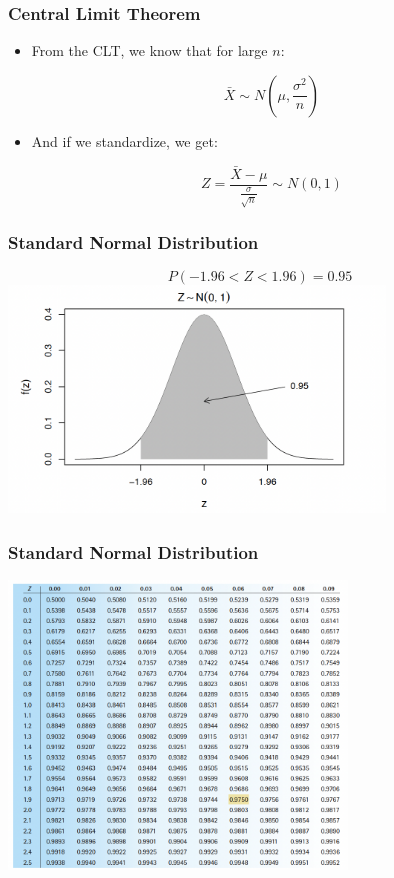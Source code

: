 \documentclass[12pt]{beamer}
\begin{document}
\begin{frame}
	\frametitle{Central Limit Theorem}
	
	\begin{itemize}[label={\color{blue}$\blacktriangleright$}]
		\item From the CLT, we know that for large $n$:
		
		\[
		\bar{X} \sim N\left(\mu, \frac{\sigma^2}{n}\right)
		\]
		
		\item And if we standardize, we get:
		
		\[
		Z = \frac{\bar{X} - \mu}{\frac{\sigma}{\sqrt{n}}} \sim N(0, 1)
		\]
	\end{itemize}
	
\end{frame}
\begin{frame}
	\frametitle{Standard Normal Distribution}
	$$P(-1.96<Z<1.96)=0.95$$
	\centering
	\includegraphics[width=10cm]{standard.png}
\end{frame}
\begin{frame}
	\frametitle{Standard Normal Distribution}
	\centering
	\includegraphics[width=9cm]{ztable.png}
\end{frame}
\end{document}
